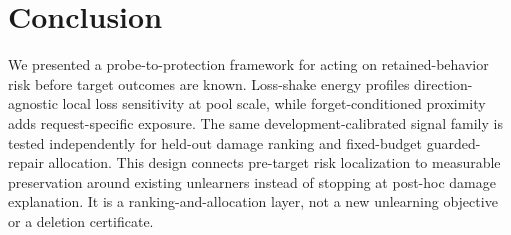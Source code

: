 \section{Conclusion}
\label{sec:conclusion}

We presented a probe-to-protection framework for acting on
retained-behavior risk before target outcomes are known. Loss-shake energy
profiles direction-agnostic local loss sensitivity at pool scale, while
forget-conditioned proximity adds request-specific exposure. The same
development-calibrated signal family is tested independently for held-out
damage ranking and fixed-budget guarded-repair allocation.
This design connects pre-target risk localization to measurable preservation
around existing unlearners instead of stopping at post-hoc damage
explanation. It is a ranking-and-allocation layer, not a new unlearning
objective or a deletion certificate.
